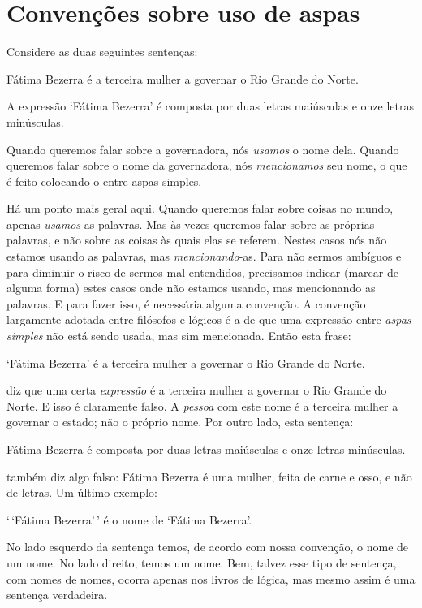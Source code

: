 \section{Convenções sobre uso de aspas}
Considere as duas seguintes sentenças:
	\begin{ebullet}
		\item Fátima Bezerra é a terceira mulher a governar o Rio Grande do Norte.
		\item A expressão `Fátima Bezerra' é composta por duas letras maiúsculas e onze letras minúsculas.
	\end{ebullet}
Quando queremos falar sobre a governadora, nós \emph{usamos} o nome dela.
Quando queremos falar sobre o nome da governadora, nós \emph{mencionamos} seu nome, o que é feito colocando-o entre aspas simples.

Há um ponto mais geral aqui.
Quando queremos falar sobre coisas no mundo, apenas \emph{usamos} as palavras.
Mas às vezes queremos falar sobre as próprias palavras, e não sobre as coisas às quais elas se referem.
Nestes casos nós não estamos usando as palavras, mas \emph{mencionando}-as.
Para não sermos ambíguos e para diminuir o risco de sermos mal entendidos, precisamos indicar (marcar de alguma forma) estes casos onde não estamos usando, mas mencionando as palavras. 
E para fazer isso, é necessária alguma convenção.
A convenção largamente adotada entre filósofos e lógicos é a de que uma expressão entre \emph{aspas simples} não está sendo usada, mas sim mencionada.
Então esta frase:
	\begin{ebullet}
		\item `Fátima Bezerra' é a terceira mulher a governar o Rio Grande do Norte.
	\end{ebullet}
diz que uma certa \emph{expressão} é a terceira mulher a governar o Rio Grande do Norte.
E isso é claramente falso.
A \emph{pessoa} com este nome é a terceira mulher a governar o estado; não o próprio nome.
Por outro lado, esta sentença:
	\begin{ebullet}
		\item Fátima Bezerra é composta por duas letras maiúsculas e onze letras minúsculas.
	\end{ebullet}
também diz algo falso:
Fátima Bezerra é uma mulher, feita de carne e osso, e não de letras.
Um último exemplo:
	\begin{ebullet}
		\item `\,`Fátima Bezerra'\,' é o nome de `Fátima Bezerra'.
	\end{ebullet} 
No lado esquerdo da sentença temos, de acordo com nossa convenção, o nome de um nome.
No lado direito, temos um nome.
Bem, talvez esse tipo de sentença, com nomes de nomes, ocorra apenas nos livros de lógica, mas mesmo assim é uma sentença verdadeira.

